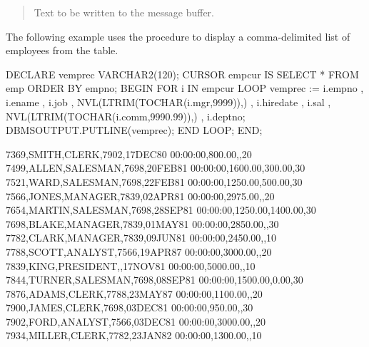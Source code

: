 \documentclass[letterpaper,10pt,english,openany,oneside]{sphinxmanual}
\begin{document}

\begin{quote}

Text to be written to the message buffer.
\end{quote}


The following example uses the  procedure to display a
comma-delimited list of employees from the  table.

%
\begin{sphinxVerbatim}[commandchars=\\\{\}]
DECLARE
    v\PYGZus{}emprec        VARCHAR2(120);
    CURSOR emp\PYGZus{}cur IS SELECT * FROM emp ORDER BY empno;
BEGIN
    FOR i IN emp\PYGZus{}cur LOOP
        v\PYGZus{}emprec := i.empno \textbar{}\textbar{} \PYGZsq{},\PYGZsq{} \textbar{}\textbar{} i.ename \textbar{}\textbar{} \PYGZsq{},\PYGZsq{} \textbar{}\textbar{} i.job \textbar{}\textbar{} \PYGZsq{},\PYGZsq{} \textbar{}\textbar{}
            NVL(LTRIM(TO\PYGZus{}CHAR(i.mgr,\PYGZsq{}9999\PYGZsq{})),\PYGZsq{}\PYGZsq{}) \textbar{}\textbar{} \PYGZsq{},\PYGZsq{} \textbar{}\textbar{} i.hiredate \textbar{}\textbar{}
            \PYGZsq{},\PYGZsq{} \textbar{}\textbar{} i.sal \textbar{}\textbar{} \PYGZsq{},\PYGZsq{} \textbar{}\textbar{}
            NVL(LTRIM(TO\PYGZus{}CHAR(i.comm,\PYGZsq{}9990.99\PYGZsq{})),\PYGZsq{}\PYGZsq{}) \textbar{}\textbar{} \PYGZsq{},\PYGZsq{} \textbar{}\textbar{} i.deptno;
        DBMS\PYGZus{}OUTPUT.PUT\PYGZus{}LINE(v\PYGZus{}emprec);
    END LOOP;
END;

7369,SMITH,CLERK,7902,17\PYGZhy{}DEC\PYGZhy{}80 00:00:00,800.00,,20
7499,ALLEN,SALESMAN,7698,20\PYGZhy{}FEB\PYGZhy{}81 00:00:00,1600.00,300.00,30
7521,WARD,SALESMAN,7698,22\PYGZhy{}FEB\PYGZhy{}81 00:00:00,1250.00,500.00,30
7566,JONES,MANAGER,7839,02\PYGZhy{}APR\PYGZhy{}81 00:00:00,2975.00,,20
7654,MARTIN,SALESMAN,7698,28\PYGZhy{}SEP\PYGZhy{}81 00:00:00,1250.00,1400.00,30
7698,BLAKE,MANAGER,7839,01\PYGZhy{}MAY\PYGZhy{}81 00:00:00,2850.00,,30
7782,CLARK,MANAGER,7839,09\PYGZhy{}JUN\PYGZhy{}81 00:00:00,2450.00,,10
7788,SCOTT,ANALYST,7566,19\PYGZhy{}APR\PYGZhy{}87 00:00:00,3000.00,,20
7839,KING,PRESIDENT,,17\PYGZhy{}NOV\PYGZhy{}81 00:00:00,5000.00,,10
7844,TURNER,SALESMAN,7698,08\PYGZhy{}SEP\PYGZhy{}81 00:00:00,1500.00,0.00,30
7876,ADAMS,CLERK,7788,23\PYGZhy{}MAY\PYGZhy{}87 00:00:00,1100.00,,20
7900,JAMES,CLERK,7698,03\PYGZhy{}DEC\PYGZhy{}81 00:00:00,950.00,,30
7902,FORD,ANALYST,7566,03\PYGZhy{}DEC\PYGZhy{}81 00:00:00,3000.00,,20
7934,MILLER,CLERK,7782,23\PYGZhy{}JAN\PYGZhy{}82 00:00:00,1300.00,,10
\end{sphinxVerbatim}
\end{document}
